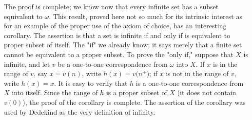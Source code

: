 The proof is complete; we know now that every infinite set has a subset equivalent to $\omega$. This result, proved here not so much for its intrinsic interest as for an example of the proper use of the axiom of choice, has an interesting corollary. The assertion is that a set is infinite if and only if is equivalent to proper subset of itself. The "if" we already know; it says merely that a finite set cannot be equivalent to a proper subset. To prove the "only if," suppose that $X$ is infinite, and let $v$ be a one-to-one correspondence from $\omega$ into $X$. If $x$ is in the range of $v$, say $x = v(n)$, write $h(x) = v(n^{+}$); if $x$ is not in the range of $v$, write $h(x)= x$. It is easy to verify that $h$ is a one-to-one correspondence from $X$ into itself. Since the range of $h$ is a proper subset of $X$ (it does not contain $v(0)$), the proof of the corollary is complete. The assertion of the corollary was used by Dedekind as the very definition of infinity.
